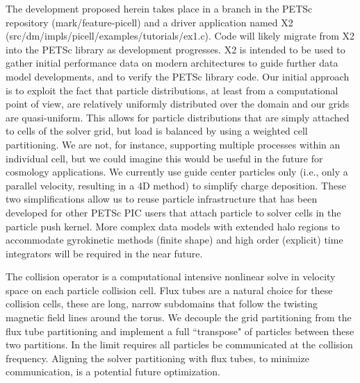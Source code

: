 \documentclass[review]{siamart}
\begin{document}
The development proposed herein takes place in a branch in the PETSc repository (mark/feature-picell) and a driver application named X2 (src/dm/impls/picell/examples/tutorials/ex1.c).
Code will likely migrate from X2 into the PETSc library as development progresses.
X2 is intended to be used to gather initial performance data on modern architectures to guide further data model developments, and to verify the PETSc library code.
Our initial approach is to exploit the fact that particle distributions, at least from a computational point of view, are relatively uniformly distributed over the domain and our grids are quasi-uniform.
This allows for particle distributions that are simply attached to cells of the solver grid, but load is balanced by using a weighted cell partitioning.
We are not, for instance, supporting multiple processes within an individual cell, but we could imagine this would be useful in the future for cosmology applications.
We currently use guide center particles only (i.e., only a parallel velocity, resulting in a 4D method) to simplify charge deposition.
These two simplifications allow us to reuse particle infrastructure that has been developed for other PETSc PIC users \cite{may2014ptatin} that attach particle to solver cells in the particle push kernel.
More complex data models with extended halo regions to accommodate gyrokinetic methods (finite shape) and high order (explicit) time integrators will be required in the near future.

The collision operator is a computational intensive nonlinear solve in velocity space on each particle collision cell.
Flux tubes are a natural choice for these collision cells, these are long, narrow subdomains that follow the twisting magnetic field lines around the torus.
We decouple the grid partitioning from the flux tube partitioning and implement a full ``transpose" of particles between these two partitions.
In the limit requires all particles be communicated at the collision frequency.
Aligning the solver partitioning with flux tubes, to minimize communication, is a potential future optimization.
\end{document}
